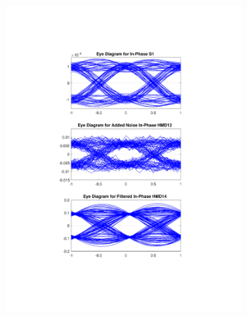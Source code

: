\begin{figure}[H]
	\centering
	\begin{subfigure}{.45\textwidth}
		\centering
		\includegraphics[clip, trim=5cm 4cm 5cm 4cm, width=\textwidth]{./sdf/m_qam_system/figures/eyes/if_p_45_03.pdf}
	\end{subfigure}
	\begin{subfigure}{.45\textwidth}
		\centering

\end{subfigure}
\end{figure}
